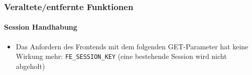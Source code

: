 %

\begin{frame}[fragile]
	\frametitle{Veraltete/entfernte Funktionen}
	\framesubtitle{Session Handhabung}

	\begin{itemize}

		\item Das Anfordern des Frontends mit dem folgenden GET-Parameter hat
			keine Wirkung mehr: \small\texttt{FE\_SESSION\_KEY}\normalsize\newline
			\small(eine bestehende Session wird nicht abgeholt)\normalsize

	\end{itemize}

\end{frame}

